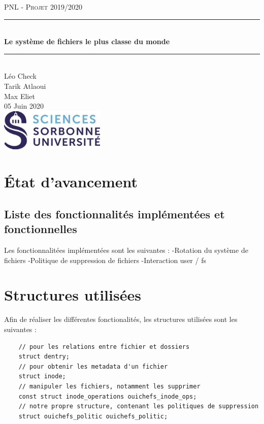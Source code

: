 \documentclass{article}
\date{\today}
\author{Léo Check\\ Tarik Atlaoui \\ Max Eliet}
\begin{document}
\begin{titlepage}
	\enlargethispage{2cm}
	\newcommand{\HRule}{\rule{\linewidth}{0.5mm}}
	\center
	\textsc{\LARGE
	PNL - Projet 2019/2020
	} \\[1cm]
	\HRule \\[0.4cm]
	{ \huge \bfseries Le système de fichiers le plus classe du monde \\[0.15cm] }
	\HRule \\[4cm]
	\large{Léo Check \\[3mm] Tarik Atlaoui \\[3mm] Max Eliet} \\[3cm]
	05 Juin 2020 \\[3cm]
	\hfill \includegraphics[width=5cm]{logoSU.jpg}
\end{titlepage}

	\newpage
	\section{État d'avancement}
	\subsection{Liste des fonctionnalités implémentées et fonctionnelles}
	Les fonctionnalitées implémentées sont les suivantes :
	\newline
	\indent  \indent  -Rotation du système de fichiers
	\newline
	\indent  \indent -Politique de suppression de fichiers
	\newline
	\indent  \indent -Interaction user / fs
	\section{Structures utilisées}
	Afin de réaliser les différentes fonctionalités, les structures utilisées sont les suivantes :
	\begin{lstlisting}
	// pour les relations entre fichier et dossiers
	struct dentry;
	// pour obtenir les metadata d'un fichier
	struct inode;
	// manipuler les fichiers, notamment les supprimer
	const struct inode_operations ouichefs_inode_ops;
	// notre propre structure, contenant les politiques de suppression
	struct ouichefs_politic ouichefs_politic;
	\end{lstlisting}
\end{document}

